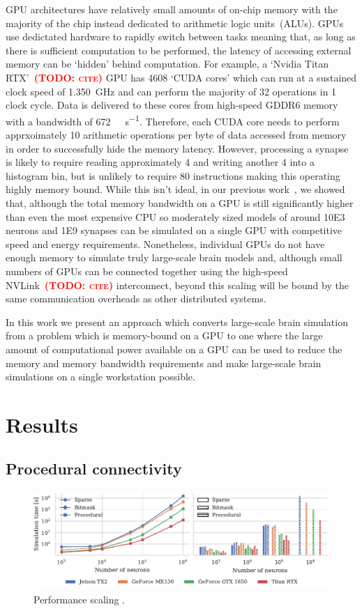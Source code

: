 \documentclass[9pt,twocolumn,twoside,lineno]{pnas-new}
\newcommand{\todo}[1]{\textbf{\textsc{\textcolor{red}{(TODO: #1)}}}}
\begin{document}
GPU architectures have relatively small amounts of on-chip memory with the majority of the chip instead dedicated to arithmetic logic units~(ALUs).
GPUs use dedictated hardware to rapidly switch between tasks meaning that, as long as there is sufficient computation to be performed, the latency of accessing external memory can be `hidden' behind computation.
For example, a `Nvidia Titan RTX'~\todo{cite} GPU has \num{4608} `CUDA cores' which can run at a sustained clock speed of \SI{1.350}{\giga\hertz} and can perform the majority of \SI{32}{\bit} operations in 1 clock cycle.
Data is delivered to these cores from high-speed GDDR6 memory with a bandwidth of \SI{672}{\giga\byte\per\second}.
Therefore, each CUDA core needs to perform apprxoimately 10 arithmetic operations per byte of data accessed from memory in order to successfully hide the memory latency.
However, processing a synapse is likely to require reading approximately \SI{4}{\byte} and writing another \SI{4}{\byte} into a histogram bin, but is unlikely to require 80 instructions making this operating highly memory bound.
While this isn't ideal, in our previous work~\citep{Knight2018}, we showed that, although the total memory bandwidth on a GPU is still significantly higher than even the most expensive CPU so moderately sized models of around \num{10E3} neurons and \num{1E9} synapses can be simulated on a single GPU with competitive speed and energy requirements.
Nonetheless, individual GPUs do not have enough memory to simulate truly large-scale brain models and, although small numbers of GPUs can be connected together using the high-speed NVLink~\todo{cite} interconnect, beyond this scaling will be bound by the same communication overheads as other distributed systems.

In this work we present an approach which converts large-scale brain simulation from a problem which is memory-bound on a GPU to one where the large amount of computational power available on a GPU can be used to reduce the memory and memory bandwidth requirements and make large-scale brain simulations on a single workstation possible.

\section*{Results}
\subsection*{Procedural connectivity}
\begin{figure}
     \centering
    \includegraphics{figures/performance_scaling}
    \caption{Performance scaling .}
    \label{fig:performance_scaling}
\end{figure}
\end{document}
